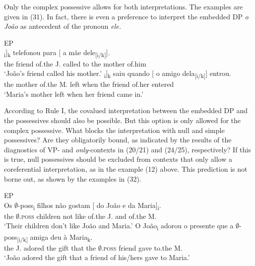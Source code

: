 \documentclass[output=paper]{langsci/langscibook}
\begin{document}
Only the complex possessive allows for both interpretations. The examples are given in (31). In fact, there is even a preference to interpret the embedded DP \textit{o João} as antecedent of the pronoun \textit{ele.}

\ea%
         EP\label{ex:wein:31}\\
    \ea  
    \gll \relax [ O amigo d[o João]\textsubscript{i}]\textsubscript{k} telefonou para [ a mãe dele\textsubscript{[i/k]}].\\
         {} the friend of.the J. called to {} the mother of.him\\
    \glt ‘João’s friend called his mother.’
    \ex  
    \gll \relax [ A mãe d[a Maria]\textsubscript{i}]\textsubscript{k} saiu quando [ o amigo dela\textsubscript{[i/k]}] entrou.\\
         {} the mother of.the M. left when {} the friend of.her entered\\
    \glt ‘Maria’s mother left when her friend came in.’
    \z
\z

According to Rule I, the covalued interpretation between the embedded DP and the possessives should also be possible. But this option is only allowed for the complex possessive. What blocks the  interpretation with null and simple possessives? Are they obligatorily bound, as indicated by the results of the diagnostics of VP- and \textit{only}{}-contexts in (20/21) and (24/25), respectively? If this is true, null possessives should be excluded from contexts that only allow a coreferential interpretation, as in the  example (12) above. This prediction is not borne out, as shown by the examples in (32).

\ea%
         EP\label{ex:wein:32}\\
    \ea  
    \gll Os $\emptyset$-poss\textsubscript{i} filhos não gostam [ do João e da Maria]\textsubscript{i}.\\
         the $\emptyset$\textsc{.poss} children not like {} of.the J. and of.the M.\\
    \glt ‘Their children don’t like João and Maria.’
    \ex 
    \gll O João\textsubscript{i} adorou o presente que a $\emptyset$-poss\textsubscript{[i/k]} amiga deu à Maria\textsubscript{k}.\\
         the J. adored the gift that the $\emptyset$\textsc{.poss} friend gave to.the M.\\
    \glt ‘João adored the gift that a friend of his\slash hers gave to Maria.’
    \z
\z    
\end{document}
